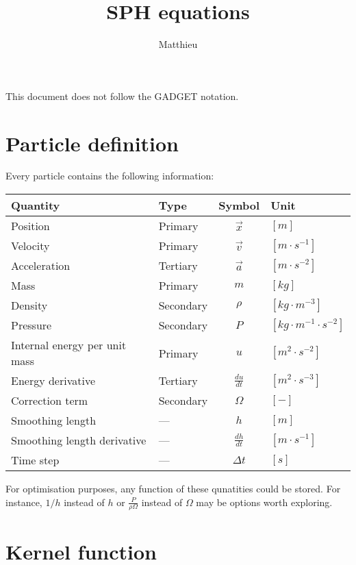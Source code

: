 \documentclass[a4paper,10pt]{article}
\title{SPH equations}
\author{Matthieu}
\begin{document}
\maketitle

This document does not follow the GADGET notation.\\

\section{Particle definition}
Every particle contains the following information:

\begin{table}[h]
\centering
\begin{tabular}{|l|l|c|l|}
 Quantity & Type & Symbol & Unit \\
 \hline \hline
 Position & Primary & $\vec{x}$ & $[m]$ \\
 Velocity & Primary &$\vec{v}$ & $[m\cdot s^{-1}]$ \\
 Acceleration & Tertiary &$\vec{a}$ & $[m\cdot s^{-2}]$ \\
 Mass & Primary &$m$ & $[kg]$ \\
 Density & Secondary & $\rho$ & $[kg\cdot m^{-3}]$ \\
 Pressure & Secondary & $P$ & $[kg \cdot m^{-1}\cdot s^{-2}]$ \\
 Internal energy per unit mass & Primary & $u$ & $[m^2 \cdot s^{-2}]$ \\ 
 Energy derivative & Tertiary & $\frac{du}{dt}$ & $[ m^2 \cdot s^{-3}]$ \\
 Correction term & Secondary & $\Omega$ & $[-]$ \\
 Smoothing length & --- &$h$ & $[m]$ \\
 Smoothing length derivative & --- &$\frac{dh}{dt}$ & $[m\cdot s^{-1}]$ \\
 Time step & --- & $\Delta t$ & $[s]$ \\
\hline
\end{tabular} 
\end{table}

For optimisation purposes, any function of these qunatities could be stored. For instance, $1/h$ instead of $h$ or
$\frac{P}{\rho\Omega}$ instead of $\Omega$ may be options worth exploring.

\section{Kernel function}
\end{document}
